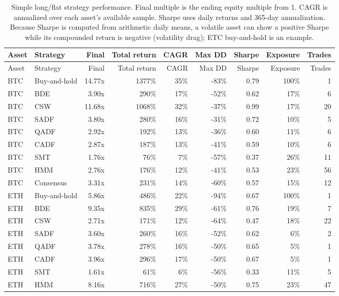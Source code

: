 \documentclass[11pt]{article}
\begin{document}
\begin{longtable}{@{}llrrrrrrr@{}}
\caption{Simple long/flat strategy performance. Final multiple is the ending equity multiple from 1. CAGR is annualized over each asset's available sample. Sharpe uses daily returns and 365-day annualization. Because Sharpe is computed from arithmetic daily means, a volatile asset can show a positive Sharpe while its compounded return is negative (volatility drag); ETC buy-and-hold is an example.}\\
\toprule
Asset & Strategy & Final & Total return & CAGR & Max DD & Sharpe & Exposure & Trades \\
\midrule
\endfirsthead
\toprule
Asset & Strategy & Final & Total return & CAGR & Max DD & Sharpe & Exposure & Trades \\
\midrule
\endhead
BTC & Buy-and-hold & 14.77x & 1377\% & 35\% & -83\% & 0.79 & 100\% & 1 \\
BTC & BDE & 3.90x & 290\% & 17\% & -52\% & 0.62 & 17\% & 6 \\
BTC & CSW & 11.68x & 1068\% & 32\% & -37\% & 0.99 & 17\% & 20 \\
BTC & SADF & 3.80x & 280\% & 16\% & -31\% & 0.72 & 10\% & 5 \\
BTC & QADF & 2.92x & 192\% & 13\% & -36\% & 0.60 & 11\% & 6 \\
BTC & CADF & 2.87x & 187\% & 13\% & -41\% & 0.59 & 10\% & 6 \\
BTC & SMT & 1.76x & 76\% & 7\% & -57\% & 0.37 & 26\% & 11 \\
BTC & HMM & 2.76x & 176\% & 12\% & -41\% & 0.53 & 23\% & 56 \\
BTC & Consensus & 3.31x & 231\% & 14\% & -60\% & 0.57 & 15\% & 12 \\
ETH & Buy-and-hold & 5.86x & 486\% & 22\% & -94\% & 0.67 & 100\% & 1 \\
ETH & BDE & 9.35x & 835\% & 29\% & -61\% & 0.76 & 19\% & 7 \\
ETH & CSW & 2.71x & 171\% & 12\% & -64\% & 0.47 & 18\% & 22 \\
ETH & SADF & 3.60x & 260\% & 16\% & -52\% & 0.62 & 6\% & 2 \\
ETH & QADF & 3.78x & 278\% & 16\% & -50\% & 0.65 & 5\% & 1 \\
ETH & CADF & 3.96x & 296\% & 17\% & -50\% & 0.67 & 5\% & 1 \\
ETH & SMT & 1.61x & 61\% & 6\% & -56\% & 0.33 & 11\% & 5 \\
ETH & HMM & 8.16x & 716\% & 27\% & -50\% & 0.75 & 23\% & 47 \\

\end{longtable}
\end{document}
